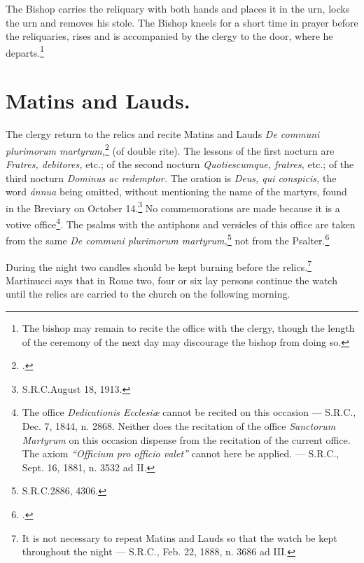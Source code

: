\documentclass[letterpaper]{report}
\newcommand\src{\textsc{S.R.C.}}
\begin{document}
{    \rubric The Bishop carries the reliquary with both hands and places it in the
    urn, locks the urn and removes his stole. The Bishop kneels for a short time in
    prayer before the reliquaries, rises and is accompanied by the clergy to the
    door, where he departs.\footnote{The bishop may remain to recite the office
    with the clergy, though the length of the ceremony of the next day may
    discourage the bishop from doing so.}

    \section{Matins and Lauds.}

    \rubric The clergy return to the relics and recite Matins and Lauds
    \textit{De communi plurimorum martyrum,}\footcite[If the relics are of
    martyrs who have a proper office in the Breviary, e.g., Ss. Vincent and
    Anastasius, Ss. Fabian and Sevastian, etc., the proper office of these
    martyrs may be recited.][n. 21, footnote 2, p. 25.]{consecranda:1956} (of
    double rite). The lessons of the first nocturn are \textit{Fratres,
    debitores,} etc.; of the second nocturn \textit{Quotiescumque, fratres,}
    etc.; of the third nocturn \textit{Dominus ac redemptor.} The oration is
    \textit{Deus, qui conspicis,} the word \textit{\'annua} being omitted,
    without mentioning the name of the martyrs, found in the Breviary on
    October 14.\footnote{\src August 18, 1913.} No commemorations are made
    because it is a votive office\footnote{The office \textit{Dedicationis
    Ecclesi\ae} cannot be recited on this occasion --- \src, Dec. 7, 1844, n.
    2868. Neither does the recitation of the office \textit{Sanctorum Martyrum}
    on this occasion dispense from the recitation of the current office. The
    axiom \textit{``Officium pro officio valet''} cannot here be applied. ---
    \src, Sept. 16, 1881, n. 3532 ad II.}. The psalms with the antiphons and
    versicles of this office are taken from the same \textit{De communi
    plurimorum martyrum,}\footnote{\src 2886, 4306.} not from the
    Psalter.\footcite[][n. 738.]{ml:1947}

    \rubric During the night two candles should be kept burning before the
    relics.\footnote{It is not necessary to repeat Matins and Lauds so that the
    watch be kept throughout the night --- \src, Feb. 22, 1888, n. 3686 ad
    III.} Martinucci says that in Rome two, four or six lay persons continue
    the watch until the relics are carried to the church on the following
    morning.

}
\end{document}
